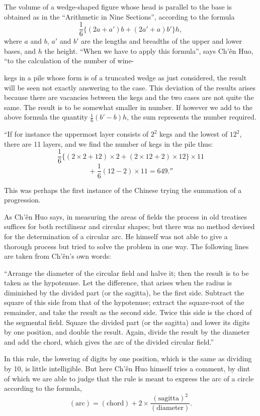 \documentclass[11pt]{article}
\newcommand{\scanpage}[2]{\clearpage\setcounter{footnote}{0}\noindent{\footnotesize\color{gray}PDF page #1 · #2}\par\medskip}
\newcommand{\scanfooter}{}
\begin{document}
The volume of a wedge-shaped figure whose head is parallel to the base is obtained as in the ``Arithmetic in Nine Sections'', according to the formula
\[
\frac{1}{6}\{(2a+a')b+(2a'+a)b'\}h,
\]
where $a$ and $b$, $a'$ and $b'$ are the lengths and breadths of the upper and lower bases, and $h$ the height. ``When we have to apply this formula'', says Ch'ên Huo, ``to the calculation of the number of wine-
\scanfooter

\scanpage{0076}{Chapter 10, printed page 62}
kegs in a pile whose form is of a truncated wedge as just considered, the result will be seen not exactly answering to the case. This deviation of the results arises because there are vacancies between the kegs and the two cases are not quite the same. The result is to be somewhat smaller in number. If however we add to the above formula the quantity $\frac{1}{6}(b'-b)h$, the sum represents the number required.

``If for instance the uppermost layer consists of $2^2$ kegs and the lowest of $12^2$, there are 11 layers, and we find the number of kegs in the pile thus:
\[
\frac{1}{6}\{(2\times2+12)\times2+(2\times12+2)\times12\}\times11
\]
\[
{}+\frac{1}{6}(12-2)\times11=649.''
\]

This was perhaps the first instance of the Chinese trying the summation of a progression.

As Ch'ên Huo says, in measuring the areas of fields the process in old treatises suffices for both rectilinear and circular shapes; but there was no method devised for the determination of a circular arc. He himself was not able to give a thorough process but tried to solve the problem in one way. The following lines are taken from Ch'ên's own words:

``Arrange the diameter of the circular field and halve it; then the result is to be taken as the hypotenuse. Let the difference, that arises when the radius is diminished by the divided part (or the sagitta), be the first side. Subtract the square of this side from that of the hypotenuse; extract the square-root of the remainder, and take the result as the second side. Twice this side is the chord of the segmental field. Square the divided part (or the sagitta) and lower its digits by one position, and double the result. Again, divide the result by the diameter and add the chord, which gives the arc of the divided circular field.''

In this rule, the lowering of digits by one position, which is the same as dividing by 10, is little intelligible. But here Ch'ên Huo himself tries a comment, by dint of which we are able to judge that the rule is meant to express the arc of a circle according to the formula,
\[
(\text{arc})=(\text{chord})+2\times\frac{(\text{sagitta})^2}{(\text{diameter})}.
\]
\scanfooter
\end{document}
